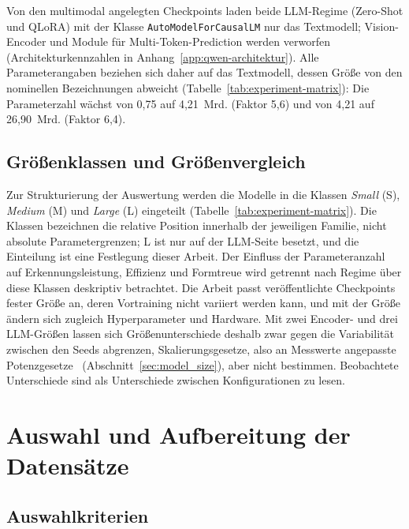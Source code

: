 Von den multimodal angelegten Checkpoints laden beide LLM-Regime (Zero-Shot
und QLoRA) mit der Klasse \texttt{AutoModelForCausalLM} nur das Textmodell; Vision-Encoder
und Module für Multi-Token-Prediction werden verworfen (Architekturkennzahlen
in Anhang~\ref{app:qwen-architektur}).
Alle Parameterangaben beziehen sich daher auf das Textmodell, dessen Größe
von den nominellen Bezeichnungen abweicht
(Tabelle~\ref{tab:experiment-matrix}): Die Parameterzahl wächst von
0,75 auf 4,21~Mrd. (Faktor 5,6) und von 4,21 auf 26,90~Mrd. (Faktor 6,4).

\subsection{Größenklassen und Größenvergleich}
\label{sec:groessenklassen}
\label{sec:einfluss-parameteranzahl}

Zur Strukturierung der Auswertung werden die Modelle in die Klassen
\emph{Small} (S), \emph{Medium} (M) und \emph{Large} (L) eingeteilt
(Tabelle~\ref{tab:experiment-matrix}).
Die Klassen bezeichnen die relative Position innerhalb der jeweiligen
Familie, nicht absolute Parametergrenzen; L ist nur auf der LLM-Seite
besetzt, und die Einteilung ist eine Festlegung dieser Arbeit.
Der Einfluss der Parameteranzahl auf Erkennungsleistung, Effizienz und
Formtreue wird getrennt nach Regime über diese Klassen deskriptiv
betrachtet.
Die Arbeit passt veröffentlichte Checkpoints fester Größe an, deren
Vortraining nicht variiert werden kann, und mit der Größe ändern sich
zugleich Hyperparameter und Hardware.
Mit zwei Encoder- und drei LLM-Größen lassen sich Größenunterschiede
deshalb zwar gegen die Variabilität zwischen den Seeds abgrenzen,
Skalierungsgesetze, also an Messwerte angepasste
Potenzgesetze~\cite{kaplan2020scaling,hoffmann2022training}
(Abschnitt~\ref{sec:model_size}), aber nicht bestimmen. Beobachtete
Unterschiede sind als Unterschiede zwischen Konfigurationen zu lesen.

\section{Auswahl und Aufbereitung der Datensätze}
\label{sec:datensaetze}

\subsection{Auswahlkriterien}
\label{sec:datenauswahl}

